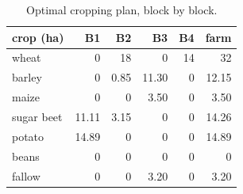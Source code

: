 \begin{table}[!ht]
\centering\footnotesize
\begin{tabular}{lrrrrr}
\toprule
crop (ha) & B1 & B2 & B3 & B4 & farm\\
\midrule
wheat  & 0 & 18 & 0 & 14 & 32\\
barley & 0 & 0.85 & 11.30 & 0 & 12.15\\
maize  & 0 & 0 & 3.50 & 0 & 3.50\\
sugar beet & 11.11 & 3.15 & 0 & 0 & 14.26\\
potato & 14.89 & 0 & 0 & 0 & 14.89\\
beans  & 0 & 0 & 0 & 0 & 0\\
fallow & 0 & 0 & 3.20 & 0 & 3.20\\
\bottomrule
\end{tabular}
\caption{Optimal cropping plan, block by block.}
\end{table}
